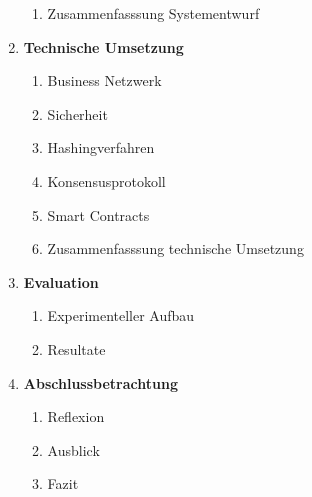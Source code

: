 \begin{small}
\begin{enumerate}
\begin{enumerate}[label*=\arabic*.]
      \item Zusammenfasssung Systementwurf
    \end{enumerate}
    \item \textbf{Technische Umsetzung}
    \begin{enumerate}[label*=\arabic*.]
      \item Business Netzwerk
      \item Sicherheit
      \item Hashingverfahren
      \item Konsensusprotokoll
      \item Smart Contracts
      \item Zusammenfasssung technische Umsetzung
    \end{enumerate}
    \item \textbf{Evaluation}
    \begin{enumerate}[label*=\arabic*.]
      \item Experimenteller Aufbau
      \item Resultate
    \end{enumerate}
    \item \textbf{Abschlussbetrachtung}
    \begin{enumerate}[label*=\arabic*.]
      \item Reflexion
      \item Ausblick
      \item Fazit
    \end{enumerate}
  \end{enumerate}



\end{small}

\newpage
